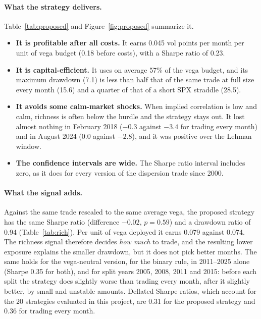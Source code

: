 \paragraph{What the strategy delivers.} Table~\ref{tab:proposed} and Figure~\ref{fig:proposed} summarize it.
\begin{itemize}
  \item \textbf{It is profitable after all costs.} It earns 0.045 vol points per month per unit of vega budget (0.18 before costs), with a Sharpe ratio of 0.23.
  \item \textbf{It is capital-efficient.} It uses on average 57\% of the vega budget, and its maximum drawdown (7.1) is less than half that of the same trade at full size every month (15.6) and a quarter of that of a short SPX straddle (28.5).
  \item \textbf{It avoids some calm-market shocks.} When implied correlation is low and calm, richness is often below the hurdle and the strategy stays out. It lost almost nothing in February 2018 ($-0.3$ against $-3.4$ for trading every month) and in August 2024 (0.0 against $-2.8$), and it was positive over the Lehman window.
  \item \textbf{The confidence intervals are wide.} The Sharpe ratio interval includes zero, as it does for every version of the dispersion trade since 2000.
\end{itemize}

\paragraph{What the signal adds.} Against the same trade rescaled to the same average vega, the proposed strategy has the same Sharpe ratio (difference $-0.02$, $p = 0.59$) and a drawdown ratio of 0.94 (Table~\ref{tab:rich}). Per unit of vega deployed it earns 0.079 against 0.074. The richness signal therefore decides \emph{how much} to trade, and the resulting lower exposure explains the smaller drawdown, but it does not pick better months. The same holds for the vega-neutral version, for the binary rule, in 2011--2025 alone (Sharpe 0.35 for both), and for split years 2005, 2008, 2011 and 2015: before each split the strategy does slightly worse than trading every month, after it slightly better, by small and unstable amounts. Deflated Sharpe ratios, which account for the 20 strategies evaluated in this project, are 0.31 for the proposed strategy and 0.36 for trading every month.

